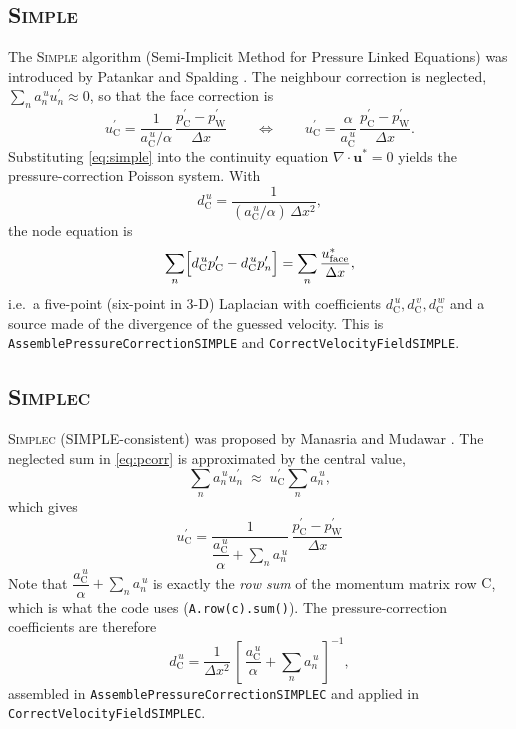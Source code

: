 \documentclass[11pt,a4paper]{article}
\newcommand{\vc}[1]{\mathbf{#1}}            %
\newcommand{\cw}{\mathrm{W}}
\newcommand{\cc}{\mathrm{C}}
\begin{document}
\subsection{\textsc{Simple}}
\label{sec:simple}

The \textsc{Simple} algorithm (Semi-Implicit Method for Pressure Linked
Equations) was introduced by Patankar and Spalding
\cite{patankar1972,patankar1980}.  The neighbour correction is neglected,
$\sum_{n}a^{\,u}_{n}u^{\prime}_{n}\approx 0$, so that the face correction is
\begin{equation}
u^{\prime}_{\cc}=\frac{1}{a^{\,u}_{\cc}/\alpha}\,
\frac{p^{\prime}_{\cc}-p^{\prime}_{\cw}}{\Delta x}
\qquad\Longleftrightarrow\qquad
u^{\prime}_{\cc}=\frac{\alpha}{a^{\,u}_{\cc}}\,
\frac{p^{\prime}_{\cc}-p^{\prime}_{\cw}}{\Delta x} .
\label{eq:simple}
\end{equation}
Substituting \eqref{eq:simple} into the continuity equation
$\nabla\!\cdot\!\vc{u}^{*}=0$ yields the pressure-correction Poisson system.
With
\begin{equation}
d^{\,u}_{\cc}=\frac{1}{(a^{\,u}_{\cc}/\alpha)\,\Delta x^{2}} ,
\end{equation}
the node equation is
\begin{equation}
\sum_{n}\Bigl[d^{\,u}_{\cc}p^{\prime}_{\cc}-d^{\,u}_{\cc}p^{\prime}_{n}\Bigr]
=\sum_{n}\frac{u^{*}_{\text{face}}}{\Delta x} ,
\end{equation}
i.e.\ a five-point (six-point in 3-D) Laplacian with coefficients
$d^{\,u}_{\cc},d^{\,v}_{\cc},d^{\,w}_{\cc}$ and a source made of the
divergence of the guessed velocity.  This is
\texttt{AssemblePressureCorrectionSIMPLE} and
\texttt{CorrectVelocityField\allowbreak SIMPLE}.

\subsection{\textsc{Simplec}}
\label{sec:simplec}

\textsc{Simplec} (SIMPLE-consistent) was proposed by Manasria and Mudawar
\cite{manasria1995}.  The neglected sum in \eqref{eq:pcorr} is approximated
by the central value,
\begin{equation}
\sum_{n}a^{\,u}_{n}u^{\prime}_{n}\;\approx\;
u^{\prime}_{\cc}\sum_{n}a^{\,u}_{n} ,
\end{equation}
which gives
\begin{equation}
\boxed{\;
u^{\prime}_{\cc}=
\frac{1}{\dfrac{a^{\,u}_{\cc}}{\alpha}+\displaystyle\sum_{n}a^{\,u}_{n}}\,
\frac{p^{\prime}_{\cc}-p^{\prime}_{\cw}}{\Delta x}
\;}
\label{eq:simplec}
\end{equation}
Note that
$\dfrac{a^{\,u}_{\cc}}{\alpha}+\sum_{n}a^{\,u}_{n}$ is exactly the
\emph{row sum} of the momentum matrix row $\cc$, which is what the code uses
(\texttt{A.row(c).sum()}).  The pressure-correction coefficients are therefore
\begin{equation}
d^{\,u}_{\cc}
=\frac{1}{\Delta x^{2}}\,\left[\,\frac{a^{\,u}_{\cc}}{\alpha}+\sum_{n}a^{\,u}_{n}\,\right]^{-1} ,
\end{equation}
assembled in \texttt{AssemblePressure\allowbreak Correction\allowbreak SIMPLEC}
and applied in
\texttt{CorrectVelocityField\allowbreak SIMPLEC}.
\end{document}
